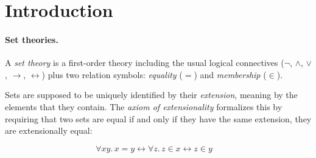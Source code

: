 \documentclass[sigplan,10pt,anonymous,review]{acmart}\settopmatter{printfolios=true,printccs=false,printacmref=false}
\begin{document}

\maketitle

\section{Introduction}


\paragraph{Set theories.}
A \emph{set theory} is a first-order theory including the usual logical connectives ($\neg$, $\land$, $\lor$, $\to$, $\leftrightarrow$) plus two relation symbols: \emph{equality} ($=$) and \emph{membership} ($\in$).


Sets are supposed to be uniquely identified by their \emph{extension}, meaning by the elements that they contain. The \emph{axiom of extensionality} formalizes this by requiring that two sets are equal if and only if they have the same extension, \ie{} they are extensionally equal:

\[\forall x y.\, x = y \leftrightarrow \forall z. \, z \in x \leftrightarrow z \in y \quad \tag{\SetExt} \]

\end{document}
